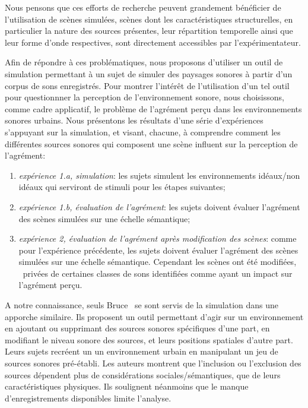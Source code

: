 \documentclass[twoside,twocolumn]{article}
\begin{document}
Nous pensons que ces efforts de recherche peuvent grandement bénéficier de l'utilisation de scènes simulées, scènes dont les caractéristiques structurelles, en particulier la nature des sources présentes, leur répartition temporelle ainsi que leur forme d'onde respectives, sont directement accessibles par l'expérimentateur.

Afin de répondre à ces problématiques, nous proposons d'utiliser un outil de simulation permettant à un sujet de simuler des paysages sonores à partir d'un corpus de sons enregistrés. Pour montrer l'intérêt de l'utilisation d'un tel outil pour questionnner la perception de l'environnement sonore, nous choisissons, comme cadre applicatif, le problème de l'agrément perçu dans les environnements sonores urbains. Nous présentons les résultats d'une série d'expériences s'appuyant sur la simulation, et visant, chacune, à comprendre comment les différentes sources sonores qui composent une scène influent sur la perception de l'agrément:

\begin{enumerate}
\item \emph{expérience 1.a, simulation}:  les sujets simulent les environnements idéaux/non idéaux qui serviront de stimuli pour les étapes suivantes;
\item \emph{expérience 1.b, évaluation de l'agrément}: les sujets doivent évaluer l'agrément des scènes simulées sur une échelle sémantique;
\item \emph{expérience 2, évaluation de l'agrément après modification des scènes}: comme pour l'expérience précédente, les sujets doivent évaluer l'agrément des scènes simulées sur une échelle sémantique. Cependant les scènes ont été modifiées, \ie~privées de certaines classes de sons identifiées comme ayant un impact sur l'agrément perçu.
\end{enumerate}

A notre connaissance, seuls Bruce~\al \cite{bruce2009development,bruce2014effects} se sont servis de la simulation dans une apporche similaire. Ils proposent un outil permettant d'agir sur un environnement en ajoutant ou supprimant des sources sonores spécifiques d'une part, en modifiant le niveau sonore des sources, et leurs positions spatiales d'autre part. Leurs sujets recréent un un environnement urbain en manipulant un jeu de sources sonores pré-établi. Les auteurs montrent que l'inclusion ou l'exclusion des sources dépendent plus de considérations sociales/sémantiques, que de leurs caractéristiques physiques. Ils soulignent néanmoins que le manque d'enregistrements disponibles limite l'analyse.
\end{document}
